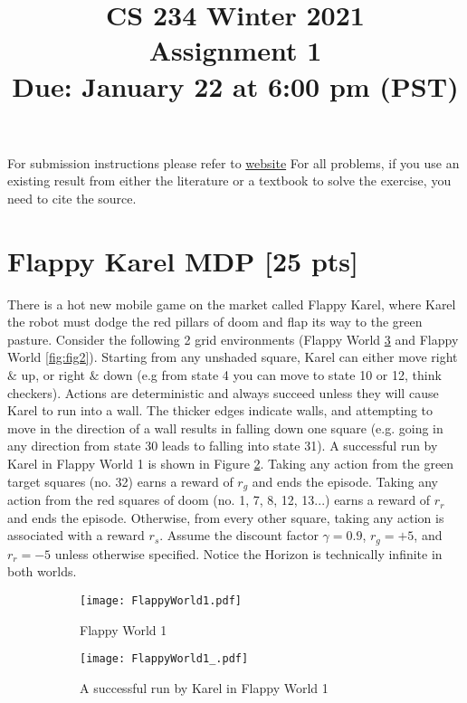 \documentclass[11pt]{article}
\title{CS 234 Winter 2021 \\ Assignment 1 \\ Due: January 22 at 6:00 pm (PST)}
\date{}
\begin{document}
  \maketitle
\noindent For submission instructions please refer to \href{http://web.stanford.edu/class/cs234/assignments.html}{website}
For all problems, if you use an existing result from either the literature or a textbook to solve the exercise, you need to cite the source.



\section{Flappy Karel MDP [25 pts]}

There is a hot new mobile game on the market called Flappy Karel, where Karel the robot must dodge the red pillars of doom and flap its way to the green pasture. Consider the following 2 grid environments (Flappy World \ref{fig:fig1} and Flappy World \ref{fig:fig2}). Starting from any unshaded square, Karel can either move right $\&$ up, or  right $\&$ down (e.g from state 4 you can move to state 10 or 12, think checkers). Actions are deterministic and always succeed unless they will cause Karel to run into a wall. The thicker edges indicate walls, and attempting to move in the direction of a wall results in falling down one square (e.g. going in any direction from state 30 leads to falling into state 31). A successful run by Karel in Flappy World 1 is shown in Figure \ref{fig:fig1.b}. Taking any action from the green target squares (no. 32) earns a reward of $r_g$  and ends the episode. Taking any action from the red squares of doom (no. 1, 7, 8, 12, 13...) earns a reward of $r_r$ and ends the episode. Otherwise, from every other square, taking any action is associated with a reward $r_s$. Assume the discount factor $\gamma = 0.9$, $r_g = +5$, and $r_r = -5$ unless otherwise specified. Notice the Horizon is technically infinite in both worlds. 


\begin{figure}[ht]
\begin{subfigure}{.5\textwidth}
  \centering
  \texttt{[image: FlappyWorld1.pdf]}  
  \caption{Flappy World 1}
  \label{fig:fig1.a}
\end{subfigure}
\begin{subfigure}{.5\textwidth}
  \centering
  \texttt{[image: FlappyWorld1\_.pdf]}  
  \caption{A successful run by Karel in Flappy World 1}
  \label{fig:fig1.b}
\end{subfigure}
\caption{}
\label{fig:fig1}
\end{figure}
\end{document}
